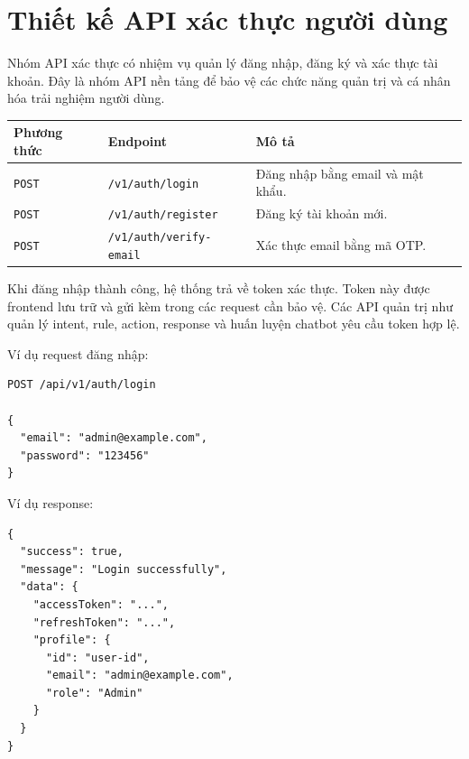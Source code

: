 \section{Thiết kế API xác thực người dùng}

Nhóm API xác thực có nhiệm vụ quản lý đăng nhập, đăng ký và xác thực tài khoản. Đây là nhóm API nền tảng để bảo vệ các chức năng quản trị và cá nhân hóa trải nghiệm người dùng.

\begin{longtable}{|p{3cm}|p{5cm}|p{7cm}|}
\hline
\textbf{Phương thức} & \textbf{Endpoint} & \textbf{Mô tả} \\
\hline
\texttt{POST} & \texttt{/v1/auth/login} & Đăng nhập bằng email và mật khẩu. \\
\hline
\texttt{POST} & \texttt{/v1/auth/register} & Đăng ký tài khoản mới. \\
\hline
\texttt{POST} & \texttt{/v1/auth/verify-email} & Xác thực email bằng mã OTP. \\
\hline
\end{longtable}

Khi đăng nhập thành công, hệ thống trả về token xác thực. Token này được frontend lưu trữ và gửi kèm trong các request cần bảo vệ. Các API quản trị như quản lý intent, rule, action, response và huấn luyện chatbot yêu cầu token hợp lệ.

Ví dụ request đăng nhập:

\begin{verbatim}
POST /api/v1/auth/login

{
  "email": "admin@example.com",
  "password": "123456"
}
\end{verbatim}

Ví dụ response:

\begin{verbatim}
{
  "success": true,
  "message": "Login successfully",
  "data": {
    "accessToken": "...",
    "refreshToken": "...",
    "profile": {
      "id": "user-id",
      "email": "admin@example.com",
      "role": "Admin"
    }
  }
}
\end{verbatim}
